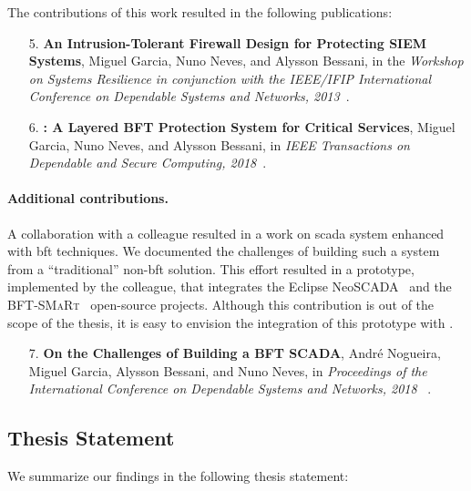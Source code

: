 The contributions of this work resulted in the following publications:

\begin{enumerate}
\item[5.] \textbf{An Intrusion-Tolerant Firewall Design for Protecting SIEM Systems}, Miguel Garcia, Nuno Neves, and Alysson Bessani, in the \emph{Workshop on Systems Resilience in conjunction with the IEEE/IFIP International Conference on Dependable Systems and Networks, 2013}~\cite{Garcia:2013}.

\item[6.] \textbf{\sieveq: A Layered BFT Protection System for Critical Services}, Miguel Garcia, Nuno Neves, and Alysson Bessani, in \emph{IEEE Transactions on Dependable and Secure Computing, 2018}~\cite{Garcia:2016}.
\end{enumerate}


\paragraph{Additional contributions.}
A collaboration with a colleague resulted in a work on \gls{scada} system enhanced with \gls{bft} techniques. 
We documented the challenges of building such a system from a ``traditional'' non-\gls{bft} solution.
This effort resulted in a prototype, implemented by the colleague, that integrates the Eclipse NeoSCADA~\cite{eclipsescada} and the \textsc{BFT-SMaRt}~\cite{Bessani:2014} open-source projects.
Although this contribution is out of the scope of the thesis, it is easy to envision the integration of this prototype with \system.


\begin{enumerate}

\item[7.] \textbf{On the Challenges of Building a BFT SCADA}, Andr\'{e} Nogueira, Miguel Garcia, Alysson Bessani, and Nuno Neves, in \emph{Proceedings of the International Conference on Dependable Systems and Networks, 2018 }~\cite{Nogueira:2018}.
\end{enumerate}


\subsection{Thesis Statement}
We summarize our findings in the following thesis statement:

\vspace{2mm}

